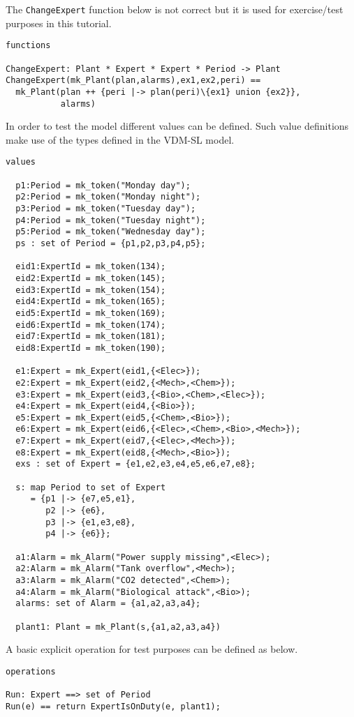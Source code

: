 The \texttt{ChangeExpert} function below is not correct but it is used
for exercise/test purposes in this tutorial.

\begin{lstlisting}
functions

ChangeExpert: Plant * Expert * Expert * Period -> Plant
ChangeExpert(mk_Plant(plan,alarms),ex1,ex2,peri) ==
  mk_Plant(plan ++ {peri |-> plan(peri)\{ex1} union {ex2}},
           alarms)
\end{lstlisting}

In order to test the model different values can be defined. Such value
definitions make use of the types defined in the VDM-SL model.

\begin{lstlisting}
values
 
  p1:Period = mk_token("Monday day");
  p2:Period = mk_token("Monday night");
  p3:Period = mk_token("Tuesday day");
  p4:Period = mk_token("Tuesday night");
  p5:Period = mk_token("Wednesday day");
  ps : set of Period = {p1,p2,p3,p4,p5};

  eid1:ExpertId = mk_token(134);
  eid2:ExpertId = mk_token(145);
  eid3:ExpertId = mk_token(154);
  eid4:ExpertId = mk_token(165);
  eid5:ExpertId = mk_token(169);
  eid6:ExpertId = mk_token(174);
  eid7:ExpertId = mk_token(181);
  eid8:ExpertId = mk_token(190);
  
  e1:Expert = mk_Expert(eid1,{<Elec>});
  e2:Expert = mk_Expert(eid2,{<Mech>,<Chem>});
  e3:Expert = mk_Expert(eid3,{<Bio>,<Chem>,<Elec>});
  e4:Expert = mk_Expert(eid4,{<Bio>});
  e5:Expert = mk_Expert(eid5,{<Chem>,<Bio>});
  e6:Expert = mk_Expert(eid6,{<Elec>,<Chem>,<Bio>,<Mech>});
  e7:Expert = mk_Expert(eid7,{<Elec>,<Mech>});
  e8:Expert = mk_Expert(eid8,{<Mech>,<Bio>});
  exs : set of Expert = {e1,e2,e3,e4,e5,e6,e7,e8};

  s: map Period to set of Expert
     = {p1 |-> {e7,e5,e1},
        p2 |-> {e6},
        p3 |-> {e1,e3,e8},
        p4 |-> {e6}};

  a1:Alarm = mk_Alarm("Power supply missing",<Elec>);
  a2:Alarm = mk_Alarm("Tank overflow",<Mech>);
  a3:Alarm = mk_Alarm("CO2 detected",<Chem>);
  a4:Alarm = mk_Alarm("Biological attack",<Bio>);
  alarms: set of Alarm = {a1,a2,a3,a4};

  plant1: Plant = mk_Plant(s,{a1,a2,a3,a4})
\end{lstlisting}  

A basic explicit operation for test purposes can be defined as below.

\begin{lstlisting}  
operations

Run: Expert ==> set of Period
Run(e) == return ExpertIsOnDuty(e, plant1);
\end{lstlisting}


